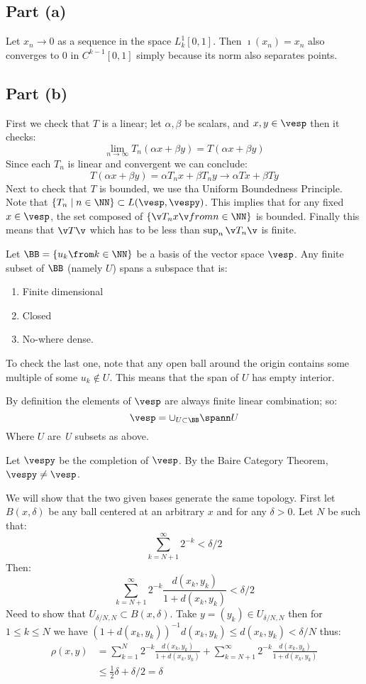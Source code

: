 \subsection*{Part (a)}
Let $x_n \to 0$ as a sequence in the space $L_k^1[0,1]$.
Then $\imath(x_n)=x_n$ also converges to $0$ in $C^{k-1}[0,1]$ simply because its norm also separates points.

\subsection*{Part (b)}
First we check that $T$ is a linear; let $\alpha,\beta$ be scalars, and $x,y\in \vesp$ then it checks:
$$\lim_{n\to \infty} T_n(\alpha x+\beta y) = T(\alpha x+\beta y)$$
Since each $T_n$ is linear and convergent we can conclude:
$$T(\alpha x+\beta y)=\alpha T_nx +\beta T_n y \to \alpha Tx + \beta Ty$$
Next to check that $T$ is bounded, we use tha Uniform Boundedness Principle.
Note that $\{T_n \mid n\in\NN \} \subset L(\vesp, \vespy)$. 
This implies that for any fixed  $x\in \vesp$, the set composed of $\{\v T_n x\v from n\in \NN\}$ is bounded.
Finally this means that $\v T\v$ which has to be less than $\sup_{n}\v T_n\v$ is finite.

Let $\BB=\{u_k\from k\in \NN\}$ be a basis of the vector space $\vesp$.
Any finite subset of $\BB$ (namely $U$) spans a subspace that is:
\begin{enumerate}
    \item Finite dimensional 
    \item Closed 
    \item No-where dense. 
\end{enumerate}
To check the last one, note that any open ball around the origin contains some multiple of some $u_k \notin U$.
This means that the span of $U$ has empty interior.

By definition the elements of $\vesp$ are always finite linear combination; so:
$$\vesp = \cup_{U\subset \BB} \spann U$$ 
Where $U$ are \emph{U} subsets as above. 

Let $\vespy$ be the completion of $\vesp$. 
By the Baire Category Theorem, $\vespy\neq \vesp$.

We will show that the two given bases generate the same topology.
First let $B(x,\delta)$ be any ball centered at an arbitrary $x$ and for any $\delta>0$. 
Let $N$ be such that:
$$\sum_{k=N+1}^\infty 2^{-k} < \delta/2$$
Then:
$$\sum_{k=N+1}^\infty 2^{-k} \frac{d(x_k,y_k)}{1+d(x_k,y_k)}< \delta/2$$
Need to show that $U_{\delta/N,N}\subset B(x,\delta)$.
Take $y=(y_k) \in U_{\delta/N,N}$ then for $1\leq k \leq N$ we have $(1+d(x_k,y_k))^{-1}d(x_k,y_k)\leq d(x_k,y_k) < \delta/N$ thus:
\begin{align*}
\rho(x,y) &= \sum_{k=1}^N 2^{-k} \frac{d(x_k,y_k)}{1+d(x_k,y_k)} + \sum_{k=N+1}^\infty 2^{-k} \frac{d(x_k,y_k)}{1+d(x_k,y_k)} \\
          &\leq \frac 12 \delta + \delta/2 = \delta
\end{align*}

